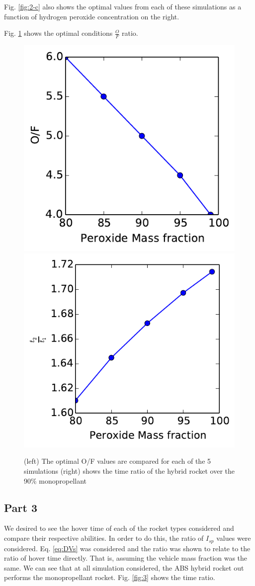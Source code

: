 \documentclass[cleanfoot,cleanhead,onecolumn,12pt,notitlepage]{asme2e}
\begin{document}
Fig. \ref{fig:2-c} also shows the optimal values from each of these simulations as a function of hydrogen peroxide concentration on the right.

Fig. \ref{fig:2-of} shows the optimal conditions $\frac{O}{F}$ ratio.  

\begin{figure}[h!]
    \begin{center}
        \includegraphics[width=0.45\linewidth]{../Plot_CEA/Part2/Part2_OF.pdf}
        \includegraphics[width=0.45\linewidth]{../Plot_CEA/Part3/Part3.pdf}
        \caption{(left) The optimal O/F values are compared for each of the 5 simulations  (right) shows the time ratio of the hybrid rocket over the 90\% monopropellant}
        \label{fig:2-of}
    \end{center}
\end{figure}

\subsection{Part 3}

We desired to see the hover time of each of the rocket types considered and compare their respective abilities.  In order to do this, the ratio of $I_{sp}$ values were considered.  Eq. \ref{eq:DVs} was considered and the ratio was shown to relate to the ratio of hover time directly.  That is, assuming the vehicle mass fraction was the same.  We can see that at all simulation considered, the ABS hybrid rocket out performs the monopropellant rocket.  Fig. \ref{fig:3} shows the time ratio.  
\end{document}
